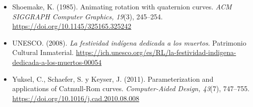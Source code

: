 \documentclass[letter,12pt]{article}
\begin{document}
\begin{itemize}[leftmargin=*]
		\item Shoemake, K. (1985). Animating rotation with quaternion curves. \textit{ACM SIGGRAPH Computer Graphics, 19}(3), 245--254. \url{https://doi.org/10.1145/325165.325242}
		\item UNESCO. (2008). \textit{La festividad indígena dedicada a los muertos}. Patrimonio Cultural Inmaterial. \url{https://ich.unesco.org/es/RL/la-festividad-indigena-dedicada-a-los-muertos-00054}
		\item Yuksel, C., Schaefer, S. y Keyser, J. (2011). Parameterization and applications of Catmull-Rom curves. \textit{Computer-Aided Design, 43}(7), 747--755. \url{https://doi.org/10.1016/j.cad.2010.08.008}
	\end{itemize}
\end{document}
